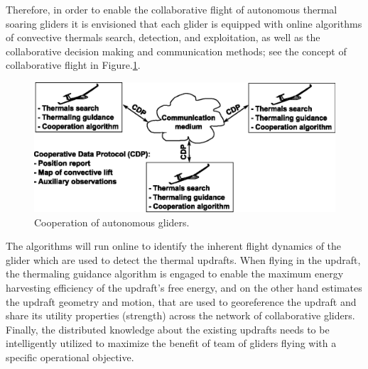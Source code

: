 \documentclass[letterpaper, 10 pt, conference]{ieeeconf}  %
\begin{document}
Therefore, in order to enable the collaborative flight of autonomous thermal soaring gliders it is envisioned that each glider is equipped with online algorithms of convective thermals search, detection, and exploitation, as well as the collaborative decision making and communication methods; see the concept of collaborative flight in Figure.\ref{fig:coop_scheme}.
\begin{figure}[thpb]
  \centering
  \includegraphics[scale=0.6]{Figures/coop_scheme_small.eps}
  \caption{Cooperation of autonomous gliders.}
  \label{fig:coop_scheme}
\end{figure}
The algorithms will run online to identify the inherent flight dynamics of the glider which are used to detect the thermal updrafts. When flying in the updraft, the thermaling guidance algorithm is engaged to enable the maximum energy harvesting efficiency of the updraft’s free energy, and on the other hand estimates the updraft geometry and motion, that are used to georeference the updraft and share its utility properties (strength) across the network of collaborative gliders. Finally, the distributed knowledge about the existing updrafts needs to be intelligently utilized to maximize the benefit of team of gliders flying with a specific operational objective.
\end{document}
